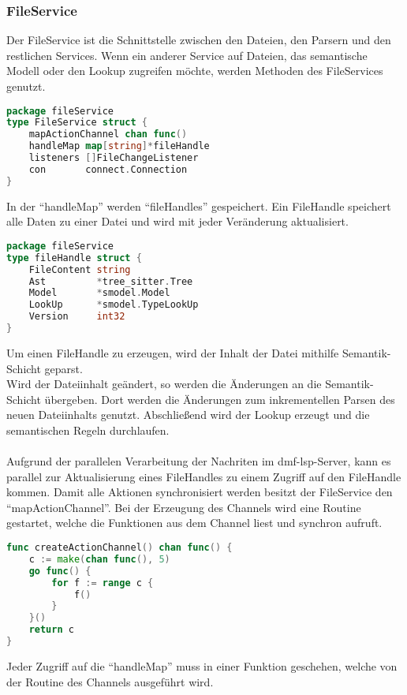 \documentclass[./einleitung.tex]{subfiles}
\begin{document}
    \subsubsection[FileService]{FileService }
    \label{subsubsec:file-service}
    Der FileService ist die Schnittstelle zwischen den Dateien, den Parsern und den restlichen Services.
    Wenn ein anderer Service auf Dateien, das semantische Modell oder den Lookup zugreifen möchte, werden Methoden des FileServices genutzt.
    \begin{lstlisting}[language=Go]
package fileService
type FileService struct {
	mapActionChannel chan func()
	handleMap map[string]*fileHandle
	listeners []FileChangeListener
	con       connect.Connection
}
    \end{lstlisting}
    In der ``handleMap'' werden ``fileHandles'' gespeichert.
    Ein FileHandle speichert alle Daten zu einer Datei und wird mit jeder Veränderung aktualisiert.
    \begin{lstlisting}[language=Go]
package fileService
type fileHandle struct {
	FileContent string
	Ast         *tree_sitter.Tree
	Model       *smodel.Model
	LookUp      *smodel.TypeLookUp
	Version     int32
}
    \end{lstlisting}
    Um einen FileHandle zu erzeugen, wird der Inhalt der Datei mithilfe Semantik-Schicht geparst.\\
    Wird der Dateiinhalt geändert, so werden die Änderungen an die Semantik-Schicht übergeben.
    Dort werden die Änderungen zum inkrementellen Parsen des neuen Dateiinhalts genutzt.
    Abschließend wird der Lookup erzeugt und die semantischen Regeln durchlaufen.
    \\\\
    Aufgrund der parallelen Verarbeitung der Nachriten im \acrshort{dmf}-\acrshort{lsp}-Server, kann es parallel zur Aktualisierung eines FileHandles zu einem Zugriff auf den FileHandle kommen.
    Damit alle Aktionen synchronisiert werden besitzt der FileService den ``mapActionChannel''.
    Bei der Erzeugung des Channels wird eine Routine gestartet, welche die Funktionen aus dem Channel liest und synchron aufruft.
    \begin{lstlisting}[language=Go, caption=Erzeugung des ActionChannels, label=lst:createActionChannel]
func createActionChannel() chan func() {
	c := make(chan func(), 5)
	go func() {
		for f := range c {
			f()
		}
	}()
	return c
}
    \end{lstlisting}
    Jeder Zugriff auf die ``handleMap'' muss in einer Funktion geschehen, welche von der Routine des Channels ausgeführt wird.
\end{document}
